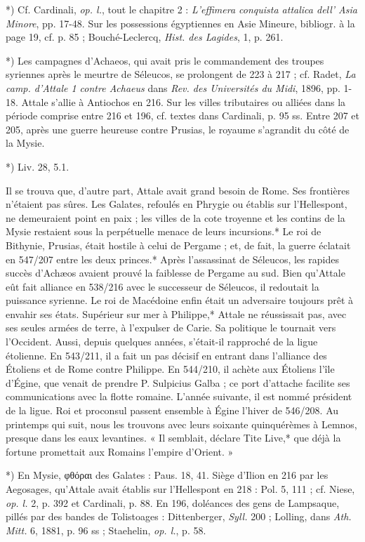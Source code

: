\documentclass[a4paper, 11pt, oneside, polutonikogreek, french]{article}
\begin{document}
*) Cf. Cardinali, \emph{op. l.}, tout le chapitre 2 : \emph{L'effimera conquista attalica dell' Asia Minore}, pp. 17-48. Sur les possessions égyptiennes en Asie Mineure, bibliogr. à la page 19, cf. p. 85 ; Bouché-Leclercq, \emph{Hist. des Lagides}, 1, p. 261.

*) Les campagnes d'Achaeos, qui avait pris le commandement des troupes syriennes après le meurtre de Séleucos, se prolongent de 223 à 217 ; cf. Radet, \emph{La camp. d'Attale 1 contre Achaeus} dans \emph{Rev. des Universités du Midi}, 1896, pp. 1-18. Attale s'allie à Antiochos en 216. Sur les villes tributaires ou alliées dans la période comprise entre 216 et 196, cf. textes dans Cardinali, p. 95 ss. Entre 207 et 205, après une guerre heureuse contre Prusias, le royaume s'agrandit du côté de la Mysie.

*) Liv. 28, 5.1.

Il se trouva que, d'autre part, Attale avait grand besoin de Rome. Ses frontières n'étaient pas sûres. Les Galates, refoulés en Phrygie ou établis sur l'Hellespont, ne demeuraient point en paix ; les villes de la cote troyenne et les contins de la Mysie restaient sous la perpétuelle menace de leurs incursions.* Le roi de Bithynie, Prusias, était hostile à celui de Pergame ; et, de fait, la guerre éclatait en 547/207 entre les deux princes.* Après l'assassinat de Séleucos, les rapides succès d'Achæos avaient prouvé la faiblesse de Pergame au sud. Bien qu'Attale eût fait alliance en 538/216 avec le successeur de Séleucos, il redoutait la puissance syrienne. Le roi de Macédoine enfin était un adversaire toujours prêt à envahir ses états. Supérieur sur mer à Philippe,* Attale ne réussissait pas, avec ses seules armées de terre, à l'expulser de Carie. Sa politique le tournait vers l'Occident. Aussi, depuis quelques années, s'était-il rapproché de la ligue étolienne. En 543/211, il a fait un pas décisif en entrant dans l'alliance des Étoliens et de Rome contre Philippe. En 544/210, il achète aux Étoliens l'île d'Égine, que venait de prendre P. Sulpicius Galba ; ce port d'attache facilite ses communications avec la flotte romaine. L'année suivante, il est nommé président de la ligue. Roi et proconsul passent ensemble à Égine l'hiver de 546/208. Au printemps qui suit, nous les trouvons avec leurs soixante quinquérèmes à Lemnos, presque dans les eaux levantines. « Il semblait, déclare Tite Live,* que déjà la fortune promettait aux Romains l'empire d'Orient. »

*) En Mysie, φθόραι des Galates : Paus. 18, 41. Siège d'Ilion en 216 par les Aegosages, qu'Attale avait établis sur l'Hellespont en 218 : Pol. 5, 111 ; cf. Niese, \emph{op. l.} 2, p. 392 et Cardinali, p. 88. En 196, doléances des gens de Lampsaque, pillés par des bandes de Tolistoages : Dittenberger, \emph{Syll.} 200 ; Lolling, dans \emph{Ath. Mitt.} 6, 1881, p. 96 ss ; Staehelin, \emph{op. l.}, p. 58.
\end{document}
